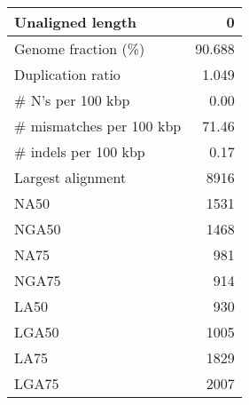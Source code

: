 \documentclass[12pt,a4paper]{article}
\begin{document}
\begin{table}[ht]
\begin{center}
\begin{tabular}{|l*{1}{|r}|}
Unaligned length & 0 \\ \hline
Genome fraction (\%) & 90.688 \\ \hline
Duplication ratio & 1.049 \\ \hline
\# N's per 100 kbp & 0.00 \\ \hline
\# mismatches per 100 kbp & 71.46 \\ \hline
\# indels per 100 kbp & 0.17 \\ \hline
Largest alignment & 8916 \\ \hline
NA50 & 1531 \\ \hline
NGA50 & 1468 \\ \hline
NA75 & 981 \\ \hline
NGA75 & 914 \\ \hline
LA50 & 930 \\ \hline
LGA50 & 1005 \\ \hline
LA75 & 1829 \\ \hline
LGA75 & 2007 \\ \hline
\end{tabular}
\end{center}
\end{table}
\end{document}
